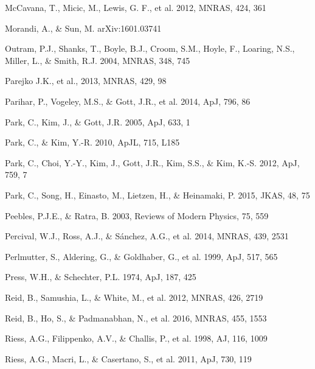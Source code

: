 \documentclass[iop]{emulateapj}
\begin{document}
\begin{thebibliography}{}
McCavana, T., Micic, M., Lewis, G. F., et al. 2012, MNRAS, 424, 361


Morandi, A., \& Sun, M. arXiv:1601.03741


Outram, P.J., Shanks, T., Boyle, B.J., Croom, S.M., Hoyle, F., Loaring, N.S., 
Miller, L., \& Smith, R.J. 2004, MNRAS, 348, 745  


Parejko J.K., et al., 2013, MNRAS, 429, 98

Parihar, P., Vogeley, M.S., \& Gott, J.R., et al. 2014, ApJ, 796, 86

Park, C., Kim, J., \& Gott, J.R. 2005, ApJ, 633, 1  

Park, C., \& Kim, Y.-R. 2010, ApJL, 715, L185  

Park, C., Choi, Y.-Y., Kim, J., Gott, J.R., Kim, S.S., \&
Kim, K.-S. 2012, ApJ, 759, 7

Park, C., Song, H., Einasto, M., Lietzen, H., \&
Heinamaki, P. 2015, JKAS, 48, 75

Peebles, P.J.E., \& Ratra, B. 2003, Reviews of Modern Physics, 75, 559

Percival, W.J., Ross, A.J., \& S\'{a}nchez, A.G., et al. 2014, MNRAS, 439, 2531

Perlmutter, S., Aldering, G., \& Goldhaber, G., et al. 1999, ApJ, 517, 565  

Press, W.H., \& Schechter, P.L. 1974, ApJ, 187, 425

Reid, B., Samushia, L., \& White, M., et al. 2012, MNRAS, 426, 2719  

Reid, B., Ho, S., \& Padmanabhan, N., et al.  2016, MNRAS, 455, 1553

Riess, A.G., Filippenko, A.V., \& Challis, P., et al. 1998, AJ, 116, 1009  

Riess, A.G., Macri, L., \& Casertano, S., et al. 2011, ApJ, 730, 119


\end{thebibliography}
\end{document}
